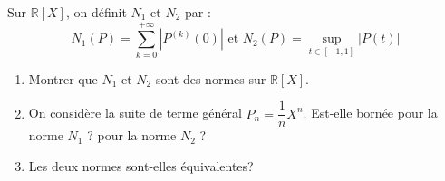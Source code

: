 Sur $\mathbb{R}[X]$, on définit $N_1$ et $N_2$ par :
$$
N_1(P)=\displaystyle\sum_{k=0}^{+\infty}\left|P^{(k)}(0)\right| \text { et } N_2(P)=\displaystyle\sup_{t \in[-1,1]}|P(t)|
$$
\begin{enumerate}
\item Montrer que $N_1$ et $N_2$ sont des normes sur $\mathbb{R}[X]$.
\item On considère la suite de terme général $P_n=\dfrac{1}{n} X^n$. Est-elle bornée pour la norme $N_1$ ? pour la norme $N_2$ ?
\item Les deux normes sont-elles équivalentes?
\end{enumerate}
